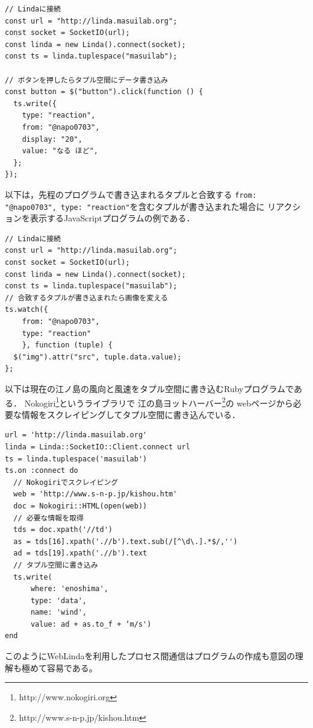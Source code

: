 \vspace{4mm}
\begin{lstlisting}
// Lindaに接続
const url = "http://linda.masuilab.org";
const socket = SocketIO(url);
const linda = new Linda().connect(socket);
const ts = linda.tuplespace("masuilab");

// ボタンを押したらタプル空間にデータ書き込み
const button = $("button").click(function () {
  ts.write({
    type: "reaction",
    from: "@napo0703",
    display: "20",
    value: "なる ほど",
  };
});
\end{lstlisting}
以下は，先程のプログラムで書き込まれるタプルと合致する
\texttt{{from: "@napo0703", type: "reaction"}}を含むタプルが書き込まれた場合に
リアクションを表示するJavaScriptプログラムの例である．
\vspace{4mm}
\begin{lstlisting}
// Lindaに接続
const url = "http://linda.masuilab.org";
const socket = SocketIO(url);
const linda = new Linda().connect(socket);
const ts = linda.tuplespace("masuilab");
// 合致するタプルが書き込まれたら画像を変える
ts.watch({
    from: "@napo0703",
    type: "reaction"
    }, function (tuple) {
  $("img").attr("src", tuple.data.value);
};
\end{lstlisting}
\vspace{4mm}
以下は現在の江ノ島の風向と風速をタプル空間に書き込むRubyプログラムである．
Nokogiri\footnote{http://www.nokogiri.org}というライブラリで
江の島ヨットハーバー\footnote{http://www.s-n-p.jp/kishou.htm}の
webページから必要な情報をスクレイピングしてタプル空間に書き込んでいる．
\vspace{4mm}
\begin{lstlisting}
url = 'http://linda.masuilab.org'
linda = Linda::SocketIO::Client.connect url
ts = linda.tuplespace('masuilab')
ts.on :connect do
  // Nokogiriでスクレイピング
  web = 'http://www.s-n-p.jp/kishou.htm'
  doc = Nokogiri::HTML(open(web))
  // 必要な情報を取得
  tds = doc.xpath('//td')
  as = tds[16].xpath('.//b').text.sub(/[^\d\.].*$/,'')
  ad = tds[19].xpath('.//b').text
  // タプル空間に書き込み
  ts.write(
      where: 'enoshima',
      type: 'data',
      name: 'wind',
      value: ad + as.to_f + ‘m/s')
end
\end{lstlisting}

このようにWebLindaを利用したプロセス間通信はプログラムの作成も意図の理解も極めて容易である。